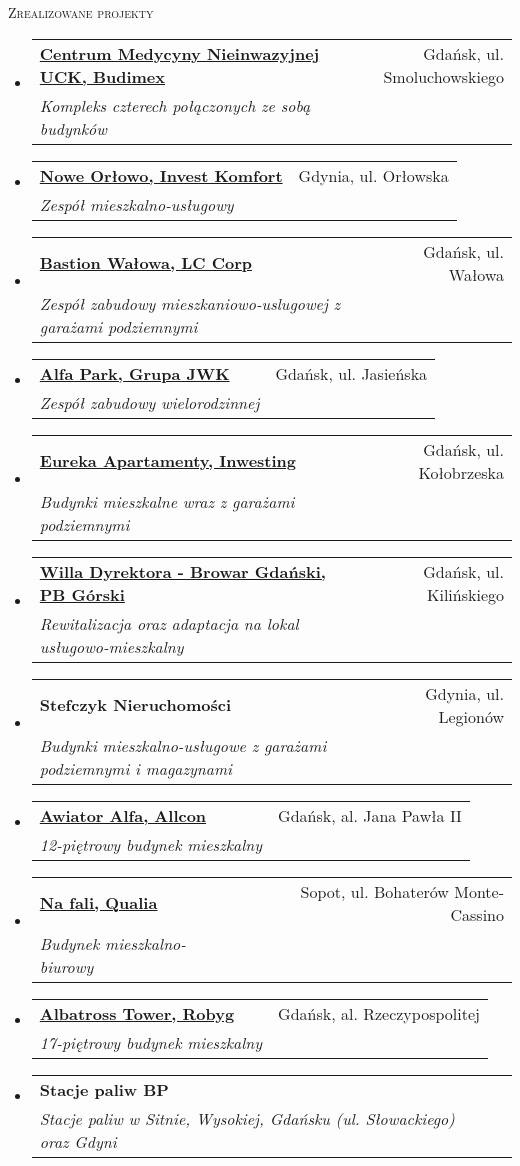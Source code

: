 \documentclass[letterpaper,11pt]{article}
\makeatletter
\newcommand{\resheading}[1]{
  \begin{tcolorbox}
  \textsc{#1}
  \end{tcolorbox}
}
\newcommand{\ressubheading}[4]{
\begin{tabular*}{6.5in}{l@{\extracolsep{\fill}}r}
		\textbf{#1} & #2 \\
		\textit{#3} & \textit{#4} \\
\end{tabular*}\vspace{-6pt}}
\makeatother
\begin{document}
\clearpage

\resheading{Zrealizowane projekty}
\begin{itemize}

\item
  \ressubheading{\href{https://www.urbanity.pl/pomorskie/gdansk/centrum-medycyny-nieinwazyjnej,b4155}{Centrum Medycyny Nieinwazyjnej UCK, Budimex}}{Gdańsk, ul. Smoluchowskiego}{Kompleks czterech połączonych ze sobą budynków}{}

\item
  \ressubheading{\href{https://www.investkomfort.pl/mieszkania-gdynia/nowe-orlowo/}{Nowe Orłowo, Invest Komfort}}{Gdynia, ul. Orłowska}{Zespół mieszkalno-usługowy}{} 
  
\item
  \ressubheading{\href{https://www.ndi.pl/en/bastion-walowa}{Bastion Wałowa, LC Corp}}{Gdańsk, ul. Wałowa}{Zespół zabudowy mieszkaniowo-uslugowej z garażami podziemnymi}{}

\item
  \ressubheading{\href{https://alfapark.pl}{Alfa Park, Grupa JWK}}{Gdańsk, ul. Jasieńska}{Zespół zabudowy wielorodzinnej}{}

\item
  \ressubheading{\href{http://eurekaapartamenty.pl/}{Eureka Apartamenty, Inwesting}}{Gdańsk, ul. Kołobrzeska}{Budynki mieszkalne wraz z garażami podziemnymi}{}

\item
  \ressubheading{\href{http://www.browargdanski.pl}{Willa Dyrektora - Browar Gdański, PB Górski}}{Gdańsk, ul. Kilińskiego}{Rewitalizacja oraz adaptacja na lokal usługowo-mieszkalny}{}

\item
  \ressubheading{Stefczyk Nieruchomości}{Gdynia, ul. Legionów}{Budynki mieszkalno-usługowe z garażami podziemnymi i magazynami}{}
  
\item
  \ressubheading{\href{https://www.allcon.pl/mieszkania/apartamenty/awiator}{Awiator Alfa, Allcon}}{Gdańsk, al. Jana Pawła II}{12-piętrowy budynek mieszkalny}{}

\item
  \ressubheading{\href{https://dom.trojmiasto.pl/Na-Fali-i310.html}{Na fali, Qualia}}{Sopot, ul. Bohaterów Monte-Cassino}{Budynek mieszkalno-biurowy}{}

\item
  \ressubheading{\href{https://www.gdansk.robyg.pl/oferta/mieszkania/albatross-towers}{Albatross Tower, Robyg}}{Gdańsk, al. Rzeczypospolitej}{17-piętrowy budynek mieszkalny}{}

\item
  \ressubheading{Stacje paliw BP}{}{Stacje paliw w Sitnie, Wysokiej, Gdańsku (ul. Słowackiego) oraz Gdyni}{}

\end{itemize}
\end{document}

